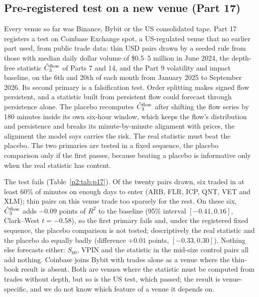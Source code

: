 \subsection{Pre-registered test on a new venue (Part 17)}\label{p2:sec:p17}
Every venue so far was Binance, Bybit or the US consolidated tape. Part 17 registers a test on Coinbase Exchange spot, a US-regulated venue that no earlier part used, from public trade data: thin USD pairs drawn by a seeded rule from those with median daily dollar volume of \$0.5--5 million in June 2024, the depth-free statistic $\hat C_3^{\rm flow}$ of Parts 7 and 14, and the Part 9 volatility and impact baseline, on the 6th and 20th of each month from January 2025 to September 2026. Its second primary is a falsification test. Order splitting makes signed flow persistent, and a statistic built from persistent flow could forecast through persistence alone. The placebo recomputes $\hat C_3^{\rm flow}$ after shifting the flow series by 180 minutes inside its own six-hour window, which keeps the flow's distribution and persistence and breaks its minute-by-minute alignment with prices, the alignment the model says carries the risk. The real statistic must beat the placebo. The two primaries are tested in a fixed sequence, the placebo comparison only if the first passes, because beating a placebo is informative only when the real statistic has content.

The test fails (Table~\ref{p2:tab:p17}). Of the twenty pairs drawn, six traded in at least 60\% of minutes on enough days to enter (ARB, FLR, ICP, QNT, VET and XLM); thin pairs on this venue trade too sparsely for the rest. On these six, $\hat C_3^{\rm flow}$ adds $-0.09$ points of $R^2$ to the baseline (95\% interval $[-0.41,0.16]$, Clark--West $t=-0.58$), so the first primary fails and, under the registered fixed sequence, the placebo comparison is not tested; descriptively the real statistic and the placebo do equally badly (difference $+0.01$ points, $[-0.33,0.30]$). Nothing else forecasts either: $S_{60}$, VPIN and the statistic in the mid-size control pairs all add nothing. Coinbase joins Bybit with trades alone as a venue where the thin-book result is absent. Both are venues where the statistic must be computed from trades without depth, but so is the US test, which passed; the result is venue-specific, and we do not know which feature of a venue it depends on.

